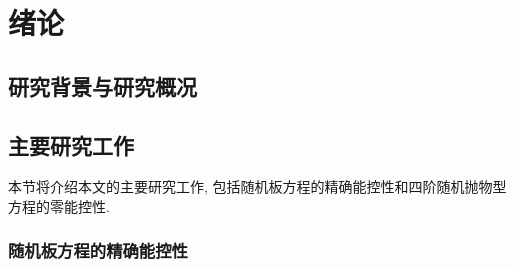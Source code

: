 \chapter{绪论}

\section{研究背景与研究概况}


\section{主要研究工作}

本节将介绍本文的主要研究工作, 包括随机板方程的精确能控性和四阶随机抛物型方程的零能控性.

\subsection{随机板方程的精确能控性}

\cite{Barbu2003}
